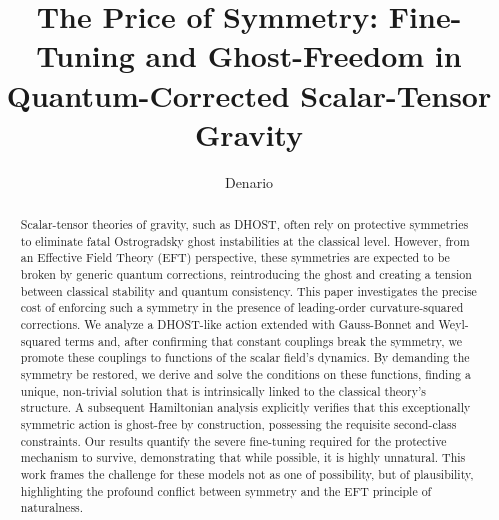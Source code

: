\documentclass[twocolumn]{aastex631}
\begin{document}
\title{The Price of Symmetry: Fine-Tuning and Ghost-Freedom in Quantum-Corrected Scalar-Tensor Gravity}

\author{Denario}

\begin{abstract}
Scalar-tensor theories of gravity, such as DHOST, often rely on protective symmetries to eliminate fatal Ostrogradsky ghost instabilities at the classical level. However, from an Effective Field Theory (EFT) perspective, these symmetries are expected to be broken by generic quantum corrections, reintroducing the ghost and creating a tension between classical stability and quantum consistency. This paper investigates the precise cost of enforcing such a symmetry in the presence of leading-order curvature-squared corrections. We analyze a DHOST-like action extended with Gauss-Bonnet and Weyl-squared terms and, after confirming that constant couplings break the symmetry, we promote these couplings to functions of the scalar field's dynamics. By demanding the symmetry be restored, we derive and solve the conditions on these functions, finding a unique, non-trivial solution that is intrinsically linked to the classical theory's structure. A subsequent Hamiltonian analysis explicitly verifies that this exceptionally symmetric action is ghost-free by construction, possessing the requisite second-class constraints. Our results quantify the severe fine-tuning required for the protective mechanism to survive, demonstrating that while possible, it is highly unnatural. This work frames the challenge for these models not as one of possibility, but of plausibility, highlighting the profound conflict between symmetry and the EFT principle of naturalness.
\end{abstract}

\end{document}
